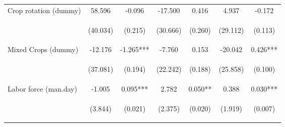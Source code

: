 \begin{center}
\begin{tabular}{lcccccc}
Crop rotation (dummy) & 58.596 & -0.096 & -17.500 & 0.416 & 4.937 & -0.172 \\
\vspace{4pt} & \begin{footnotesize}(40.034)\end{footnotesize} & \begin{footnotesize}(0.215)\end{footnotesize} & \begin{footnotesize}(30.666)\end{footnotesize} & \begin{footnotesize}(0.260)\end{footnotesize} & \begin{footnotesize}(29.112)\end{footnotesize} & \begin{footnotesize}(0.113)\end{footnotesize} \\
Mixed Crops (dummy) & -12.176 & -1.265*** & -7.760 & 0.153 & -20.042 & 0.426*** \\
\vspace{4pt} & \begin{footnotesize}(37.081)\end{footnotesize} & \begin{footnotesize}(0.194)\end{footnotesize} & \begin{footnotesize}(22.242)\end{footnotesize} & \begin{footnotesize}(0.188)\end{footnotesize} & \begin{footnotesize}(25.858)\end{footnotesize} & \begin{footnotesize}(0.100)\end{footnotesize} \\
Labor force (man.day) & -1.005 & 0.095*** & 2.782 & 0.050** & 0.388 & 0.030*** \\
\vspace{4pt} & \begin{footnotesize}(3.844)\end{footnotesize} & \begin{footnotesize}(0.021)\end{footnotesize} & \begin{footnotesize}(2.375)\end{footnotesize} & \begin{footnotesize}(0.020)\end{footnotesize} & \begin{footnotesize}(1.919)\end{footnotesize} & \begin{footnotesize}(0.007)\end{footnotesize} \\

\end{tabular}
\end{center}
